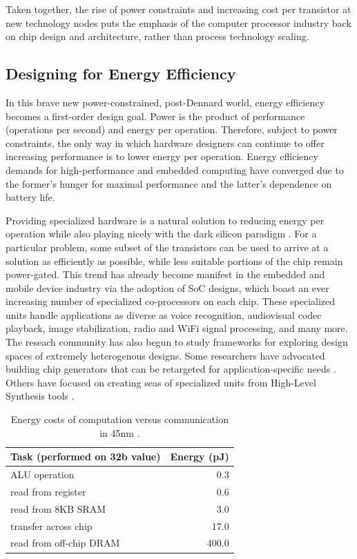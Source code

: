 Taken together, the rise of power constraints and increasing cost per transistor at new technology nodes
puts the emphasis of the computer processor industry back on chip design and architecture, rather than process technology scaling.

\subsection{Designing for Energy Efficiency}

In this brave new power-constrained, post-Dennard world, energy efficiency becomes a first-order design goal.
Power is the product of performance (operations per second) and energy per operation.
Therefore, subject to power constraints, the only way in which hardware designers can continue to offer increasing performance is to lower energy per operation.
Energy efficiency demands for high-performance and embedded computing have converged due to the former's hunger for maximal performance and the latter's dependence on battery life.

Providing specialized hardware is a natural solution to reducing energy per operation while also playing nicely with the dark silicon paradigm \cite{esmaeilzadeh2011dark}.
For a particular problem, some subset of the transistors can be used to arrive at a solution as efficiently as possible, while less suitable portions of the chip remain power-gated.
This trend has already become manifest in the embedded and mobile device industry via the adoption of SoC designs, which boast an ever increasing number of specialized co-processors on each chip.
These specialized units handle applications as diverse as voice recognition, audiovisual codec playback, image stabilization, radio and WiFi signal processing, and many more.
The reseach community has also begun to study frameworks for exploring design spaces of extremely heterogenous designs.
Some researchers have advocated building chip generators that can be retargeted for application-specific needs \cite{shacham-micro10}.
Others have focused on creating seas of specialized units from High-Level Synthesis tools \cite{shao2014aladdin, Venkatesh:2010}.

\begin{table}[tdp]
\begin{center}
\begin{tabular}{|l|r|} 
\hline
Task (performed on 32b value) & Energy (pJ) \\ \hline
ALU operation & 0.3 \\ \hline
read from register & 0.6 \\ \hline
read from 8KB SRAM & 3.0 \\ \hline
transfer across chip & 17.0 \\ \hline
read from off-chip DRAM & 400.0 \\ \hline
\end{tabular}
\end{center}
\caption{Energy costs of computation versus communication in 45nm \cite{dally-hpca02}. }
\label{tab:movement}
\end{table}


